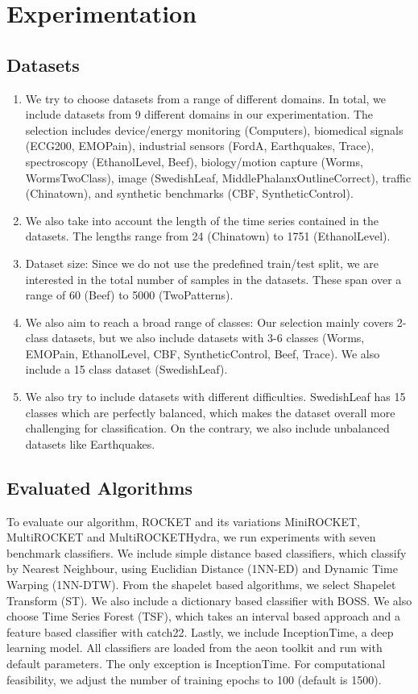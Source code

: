 \section{Experimentation}
\label{sec:exp}

\subsection{Datasets}
\begin{enumerate}
	\item We try to choose datasets from a range of different domains. In total, we include datasets from 9 different domains in our experimentation. The selection includes device/energy monitoring (Computers), biomedical signals (ECG200, EMOPain), industrial sensors (FordA, Earthquakes, Trace), spectroscopy (EthanolLevel, Beef), biology/motion capture (Worms, WormsTwoClass), image (SwedishLeaf, MiddlePhalanxOutlineCorrect), traffic (Chinatown), and synthetic benchmarks (CBF, SyntheticControl).
	\item We also take into account the length of the time series contained in the datasets. The lengths range from 24 (Chinatown) to 1751 (EthanolLevel). 
	\item Dataset size: Since we do not use the predefined train/test split, we are interested in the total number of samples in the datasets. These span over a range of 60 (Beef) to 5000 (TwoPatterns). 
	\item We also aim to reach a broad range of classes: Our selection mainly covers 2-class datasets, but we also include datasets with 3-6 classes (Worms, EMOPain, EthanolLevel, CBF, SyntheticControl, Beef, Trace). We also include a 15 class dataset (SwedishLeaf). 
	\item We also try to include datasets with different difficulties. SwedishLeaf has 15 classes which are perfectly balanced, which makes the dataset overall more challenging for classification. On the contrary, we also include unbalanced datasets like Earthquakes.
\end{enumerate}

\subsection{Evaluated Algorithms}
To evaluate our algorithm, ROCKET and its variations MiniROCKET, MultiROCKET and MultiROCKETHydra, we run experiments with seven benchmark classifiers. We include simple distance based classifiers, which classify by Nearest Neighbour, using Euclidian Distance (1NN-ED) and Dynamic Time Warping (1NN-DTW). From the shapelet based algorithms, we select Shapelet Transform (ST). We also include a dictionary based classifier with BOSS. We also choose Time Series Forest (TSF), which takes an interval based approach and a feature based classifier with catch22. Lastly, we include InceptionTime, a deep learning model. 
All classifiers are loaded from the aeon toolkit and run with default parameters. The only exception is InceptionTime. For computational feasibility, we adjust the number of training epochs to 100 (default is 1500). 

